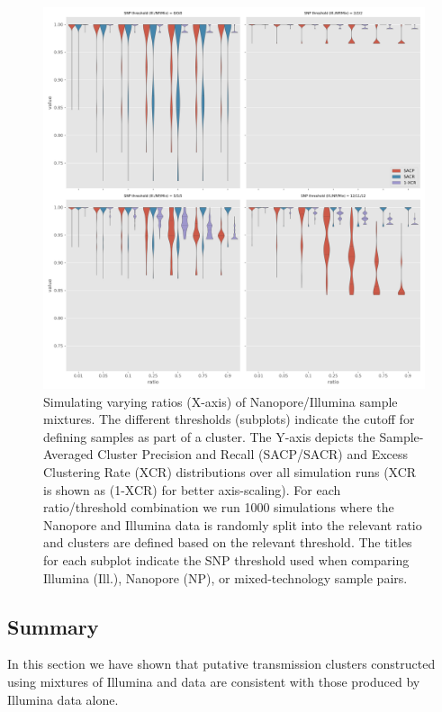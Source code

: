 \begin{figure}
\begin{center}
\includegraphics[width=0.90\columnwidth]{Chapter2/Figs/mixed_simulations.png}
\caption{{Simulating varying ratios (X-axis) of Nanopore/Illumina sample mixtures.
The different thresholds (subplots) indicate the cutoff for defining
samples as part of a cluster. The Y-axis depicts the Sample-Averaged
Cluster Precision and Recall (SACP/SACR) and Excess Clustering Rate
(XCR) distributions over all simulation runs (XCR is shown as (1-XCR)
for better axis-scaling). For each ratio/threshold combination we run
1000 simulations where the Nanopore and Illumina data is randomly split
into the relevant ratio and clusters are defined based on the relevant
threshold. The titles for each subplot indicate the SNP threshold used
when comparing Illumina (Ill.), Nanopore (NP), or mixed-technology
sample pairs.
{\label{fig:mixed-sims}}%
}}
\end{center}
\end{figure}

\subsection{Summary}

In this section we have shown that putative transmission clusters constructed using mixtures of Illumina and \ont{} data are consistent with those produced by Illumina data alone.

